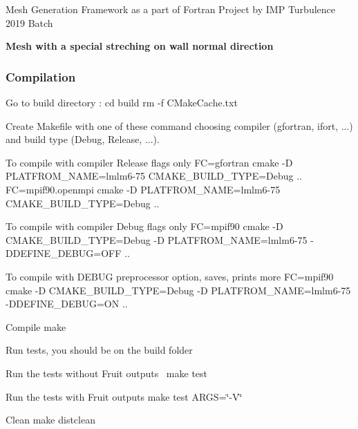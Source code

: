 Mesh Generation Framework as a part of Fortran Project by I\-M\-P Turbulence 2019 Batch

{\bfseries Mesh with a special streching on wall normal direction}



\subsubsection*{Compilation}


\begin{DoxyItemize}
\item Go to build directory \-: cd build rm -\/f C\-Make\-Cache.\-txt
\item Create Makefile with one of these command choosing compiler (gfortran, ifort, ...) and build type (Debug, Release, ...).
\begin{DoxyItemize}
\item To compile with compiler Release flags only {\ttfamily F\-C=gfortran cmake -\/\-D P\-L\-A\-T\-F\-R\-O\-M\-\_\-\-N\-A\-M\-E=lmlm6-\/75 C\-M\-A\-K\-E\-\_\-\-B\-U\-I\-L\-D\-\_\-\-T\-Y\-P\-E=Debug ..} {\ttfamily F\-C=mpif90.\-openmpi cmake -\/\-D P\-L\-A\-T\-F\-R\-O\-M\-\_\-\-N\-A\-M\-E=lmlm6-\/75 C\-M\-A\-K\-E\-\_\-\-B\-U\-I\-L\-D\-\_\-\-T\-Y\-P\-E=Debug ..}
\item To compile with compiler Debug flags only {\ttfamily F\-C=mpif90 cmake -\/\-D C\-M\-A\-K\-E\-\_\-\-B\-U\-I\-L\-D\-\_\-\-T\-Y\-P\-E=Debug -\/\-D P\-L\-A\-T\-F\-R\-O\-M\-\_\-\-N\-A\-M\-E=lmlm6-\/75 -\/\-D\-D\-E\-F\-I\-N\-E\-\_\-\-D\-E\-B\-U\-G=O\-F\-F ..}
\item To compile with D\-E\-B\-U\-G preprocessor option, saves, prints more {\ttfamily F\-C=mpif90 cmake -\/\-D C\-M\-A\-K\-E\-\_\-\-B\-U\-I\-L\-D\-\_\-\-T\-Y\-P\-E=Debug -\/\-D P\-L\-A\-T\-F\-R\-O\-M\-\_\-\-N\-A\-M\-E=lmlm6-\/75 -\/\-D\-D\-E\-F\-I\-N\-E\-\_\-\-D\-E\-B\-U\-G=O\-N ..}
\end{DoxyItemize}
\item Compile {\ttfamily make}
\item Run tests, you should be on the build folder
\begin{DoxyItemize}
\item Run the tests without Fruit outputs  {\ttfamily make test}
\item Run the tests with Fruit outputs {\ttfamily make test A\-R\-G\-S=\char`\"{}-\/\-V\char`\"{}}
\end{DoxyItemize}
\item Clean {\ttfamily make distclean}
\end{DoxyItemize}

